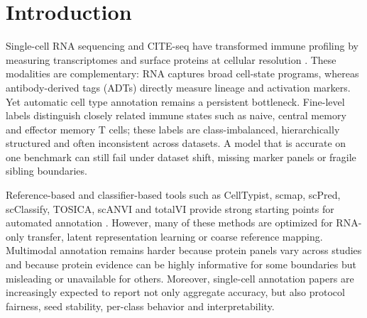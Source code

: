 \documentclass[unnumsec,webpdf,contemporary,large,numbered]{oup-authoring-template}
\begin{document}

\maketitle

\section{Introduction}

Single-cell RNA sequencing and CITE-seq have transformed immune profiling by measuring transcriptomes and surface proteins at cellular resolution \citep{stuart2019,stoeckius2017cite}. These modalities are complementary: RNA captures broad cell-state programs, whereas antibody-derived tags (ADTs) directly measure lineage and activation markers. Yet automatic cell type annotation remains a persistent bottleneck. Fine-level labels distinguish closely related immune states such as naive, central memory and effector memory T cells; these labels are class-imbalanced, hierarchically structured and often inconsistent across datasets. A model that is accurate on one benchmark can still fail under dataset shift, missing marker panels or fragile sibling boundaries.

Reference-based and classifier-based tools such as CellTypist, scmap, scPred, scClassify, TOSICA, scANVI and totalVI provide strong starting points for automated annotation \citep{aran2019,kiselev2018scmap,alquicira2020scpred,lin2020scclassify,chen2023tosica,xu2021scvi,gayoso2021totalvi}. However, many of these methods are optimized for RNA-only transfer, latent representation learning or coarse reference mapping. Multimodal annotation remains harder because protein panels vary across studies and because protein evidence can be highly informative for some boundaries but misleading or unavailable for others. Moreover, single-cell annotation papers are increasingly expected to report not only aggregate accuracy, but also protocol fairness, seed stability, per-class behavior and interpretability.
\end{document}
